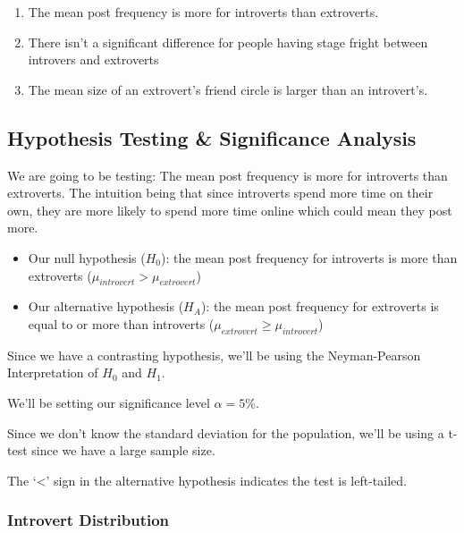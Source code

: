 \documentclass[
]{article}
\providecommand{\tightlist}{%
  \setlength{\itemsep}{0pt}\setlength{\parskip}{0pt}}
\begin{document}
\begin{enumerate}
\def\labelenumi{\arabic{enumi}.}
\tightlist
\item
  The mean post frequency is more for introverts than extroverts.
\item
  There isn't a significant difference for people having stage fright
  between introvers and extroverts
\item
  The mean size of an extrovert's friend circle is larger than an
  introvert's.
\end{enumerate}

\hypertarget{hypothesis-testing-significance-analysis}{%
\subsection{Hypothesis Testing \& Significance
Analysis}\label{hypothesis-testing-significance-analysis}}

We are going to be testing: The mean post frequency is more for
introverts than extroverts. The intuition being that since introverts
spend more time on their own, they are more likely to spend more time
online which could mean they post more.

\begin{itemize}
\item
  Our null hypothesis (\(H_0\)): the mean post frequency for introverts
  is more than extroverts (\(\mu_{introvert} > \mu_{extrovert}\))
\item
  Our alternative hypothesis (\(H_A\)): the mean post frequency for
  extroverts is equal to or more than introverts
  (\(\mu_{extrovert} \ge \mu_{introvert}\))
\end{itemize}

Since we have a contrasting hypothesis, we'll be using the
Neyman-Pearson Interpretation of \(H_0\) and \(H_1\).

We'll be setting our significance level \(\alpha = 5\%\).

Since we don't know the standard deviation for the population, we'll be
using a t-test since we have a large sample size.

The `\textless{}' sign in the alternative hypothesis indicates the test
is left-tailed.

\hypertarget{introvert-distribution}{%
\subsubsection{Introvert Distribution}\label{introvert-distribution}}
\end{document}
